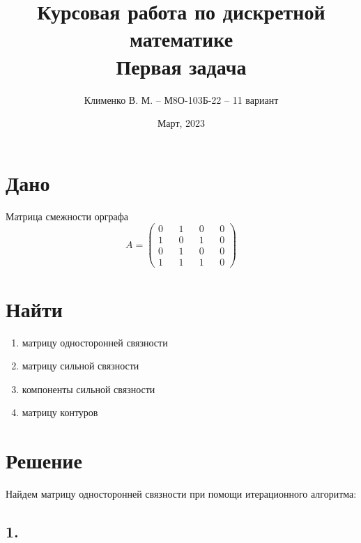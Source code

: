 \documentclass[a4paper,12pt]{article} %
\title{Курсовая работа по дискретной математике\\Первая задача}
\author{Клименко В. М. -- М8О-103Б-22 -- 11 вариант}
\date{Март, 2023}
\begin{document}
\maketitle
               
\section*{Дано}
Матрица смежности орграфа
$$
A =
\begin{pmatrix}
  0 && 1 && 0 && 0 \\
  1 && 0 && 1 && 0 \\
  0 && 1 && 0 && 0 \\
  1 && 1 && 1 && 0
\end{pmatrix}
$$

\section*{Найти}
\begin{enumerate}
\item матрицу односторонней связности
\item матрицу сильной связности
\item компоненты сильной связности 
\item матрицу контуров
\end{enumerate}

\section*{Решение}
Найдем матрицу односторонней связности при помощи итерационного алгоритма:

\subsection*{1.}
\end{document}
